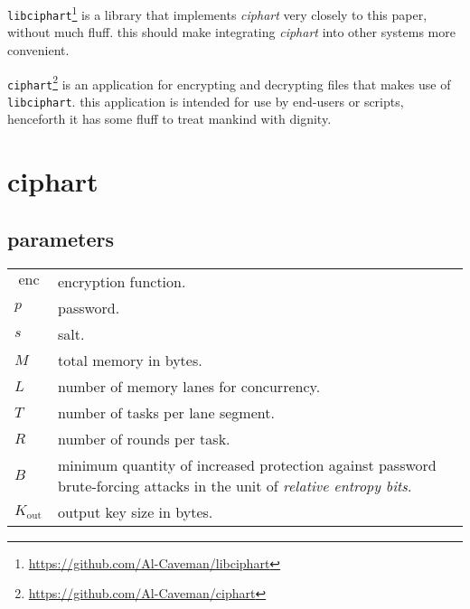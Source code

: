 \documentclass[twocolumn]{article}
\DeclareMathOperator{\enc}{enc}
\begin{document}
\texttt{libciphart}\footnote{\url{https://github.com/Al-Caveman/libciphart}}
is a library that implements \emph{ciphart} very closely to this paper,
without much fluff.  this should make integrating \emph{ciphart} into other
systems more convenient.

\texttt{ciphart}\footnote{\url{https://github.com/Al-Caveman/ciphart}} is
an application for encrypting and decrypting files that makes use of
\texttt{libciphart}.  this application is intended for use by end-users or
scripts, henceforth it has some fluff to treat mankind with dignity.


\section{ciphart}
\subsection{parameters}
\begin{tabularx}{\columnwidth}{lX}
    $\enc$ & encryption function.\\
    $p$ & password.\\
    $s$ & salt.\\
    $M$ & total memory in bytes.\\
    $L$ & number of memory lanes for concurrency.\\
    $T$ & number of tasks per lane segment.\\
    $R$ & number of rounds per task.\\
    $B$ & minimum quantity of increased protection against password
            brute-forcing attacks in the unit of \emph{relative entropy
            bits}.\\
    $K_{\text{out}}$ & output key size in bytes.\\
\end{tabularx}
\end{document}
